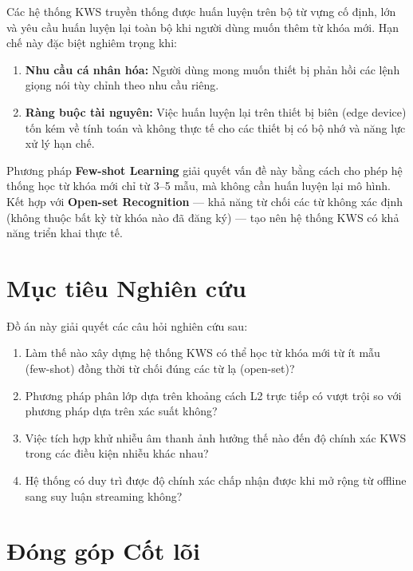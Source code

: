 \documentclass[12pt,a4paper]{report}
\begin{document}
Các hệ thống KWS truyền thống được huấn luyện trên bộ từ vựng cố định, lớn và
yêu cầu huấn luyện lại toàn bộ khi người dùng muốn thêm từ khóa mới. Hạn chế
này đặc biệt nghiêm trọng khi:

\begin{enumerate}
    \item \textbf{Nhu cầu cá nhân hóa:} Người dùng mong muốn thiết bị phản hồi
          các lệnh giọng nói tùy chỉnh theo nhu cầu riêng.
    \item \textbf{Ràng buộc tài nguyên:} Việc huấn luyện lại trên thiết bị biên
          (edge device) tốn kém về tính toán và không thực tế cho các thiết bị
          có bộ nhớ và năng lực xử lý hạn chế.
\end{enumerate}

Phương pháp \textbf{Few-shot Learning} giải quyết vấn đề này bằng cách cho phép
hệ thống học từ khóa mới chỉ từ 3--5 mẫu, mà không cần huấn luyện lại mô hình.
Kết hợp với \textbf{Open-set Recognition} --- khả năng từ chối các từ không xác
định (không thuộc bất kỳ từ khóa nào đã đăng ký) --- tạo nên hệ thống KWS có
khả năng triển khai thực tế.

\section{Mục tiêu Nghiên cứu}

Đồ án này giải quyết các câu hỏi nghiên cứu sau:

\begin{enumerate}
    \item Làm thế nào xây dựng hệ thống KWS có thể học từ khóa mới từ ít mẫu
          (few-shot) đồng thời từ chối đúng các từ lạ (open-set)?
    \item Phương pháp phân lớp dựa trên khoảng cách L2 trực tiếp có vượt trội
          so với phương pháp dựa trên xác suất không?
    \item Việc tích hợp khử nhiễu âm thanh ảnh hưởng thế nào đến độ chính xác
          KWS trong các điều kiện nhiễu khác nhau?
    \item Hệ thống có duy trì được độ chính xác chấp nhận được khi mở rộng từ
          offline sang suy luận streaming không?
\end{enumerate}

\section{Đóng góp Cốt lõi}
\end{document}
